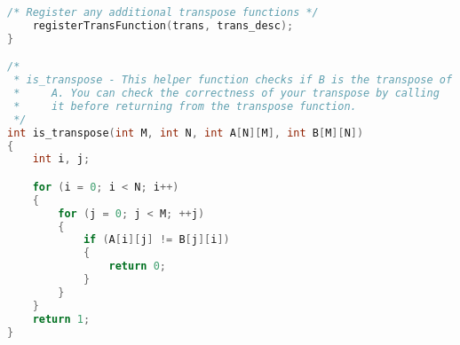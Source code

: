 \begin{lstlisting}[language = C,title= Coding in C]
    /* Register any additional transpose functions */
    registerTransFunction(trans, trans_desc);
}

/*
 * is_transpose - This helper function checks if B is the transpose of
 *     A. You can check the correctness of your transpose by calling
 *     it before returning from the transpose function.
 */
int is_transpose(int M, int N, int A[N][M], int B[M][N])
{
    int i, j;

    for (i = 0; i < N; i++)
    {
        for (j = 0; j < M; ++j)
        {
            if (A[i][j] != B[j][i])
            {
                return 0;
            }
        }
    }
    return 1;
}
\end{lstlisting}
